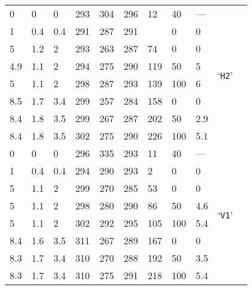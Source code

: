\begin{longtable}{llll llll lll}
	 \hdashline
	\num{0} & \num{0} &  \num{0} & \num{293} & \num{304} & \num{296} & \num{12} & 40 & --- & \multirow{8}{*}{`\texttt{H2}'} \\*
	\num{1} & \num{.4} & \num{.4} & \num{291} & \num{287} & \num{291} & \echaf{\num{-.9}} & \num{0} & \num{0} & \\*
	\num{5} & \num{1.2} & \num{2} & \num{293} & \num{263} & \num{287} & \num{74} & \num{0} & \num{0} & \\*
	\num{4.9} & \num{1.1} &  \num{2} & \num{294} & \num{275} & \num{290} & \num{119} & \num{50} & \num{5} & \\*
	\num{5} & \num{1.1} &  \num{2} & \num{298} & \num{287} & \num{293} & \num{139} & \num{100} & \num{6} & \\*
	\num{8.5} & \num{1.7} & \num{3.4} & \num{299} & \num{257} & \num{284} & \num{158} & \num{0} & \num{0} & \\*
	\num{8.4} & \num{1.8} &  \num{3.5} & \num{299} & \num{267} & \num{287} & \num{202} & \num{50} & \num{2.9} & \\*
	\num{8.4} & \num{1.8} &  \num{3.5} & \num{302} & \num{275} & \num{290} & \num{226} & \num{100} & \num{5.1} & \\
	
	 \hdashline
	\num{0} & \num{0} & \num{0} & \num{296} & \num{335} & \num{293} & \num{11} & \num{40} & --- & \multirow{8}{*}{`\texttt{V1}'} \\*
	\num{1} & \num{.4} & \num{.4} & \num{294} & \num{290} & \num{293} & \num{2} & \num{0} & \num{0} & \\*
	\num{5} & \num{1.1} & \num{2} & \num{299} & \num{270} & \num{285} & \num{53} & \num{0} & \num{0} & \\*
	\num{5} & \num{1.1} & \num{2} & \num{298} & \num{280} & \num{290} & \num{86} & \num{50} & \num{4.6} & \\*
	\num{5} & \num{1.1} & \num{2} & \num{302} & \num{292} & \num{295} & \num{105} & \num{100} & \num{5.4} & \\*
	\num{8.4} & \num{1.6} & \num{3.5} & \num{311} & \num{267} & \num{289} & \num{167} & \num{0} & \num{0} & \\*
	\num{8.3} & \num{1.7} & \num{3.4} & \num{310} & \num{270} & \num{288} & \num{192} & \num{50} & \num{3.5} & \\*
	\num{8.3} & \num{1.7} & \num{3.4} & \num{310} & \num{275} & \num{291} & \num{218} & \num{100} & \num{5.4} & \\
	

\end{longtable}
